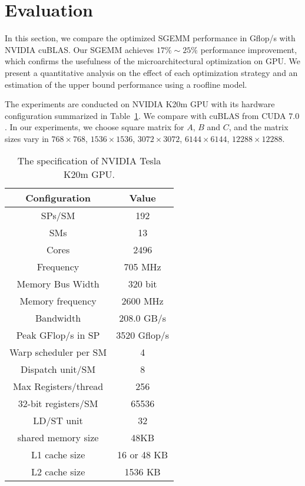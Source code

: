 \section{Evaluation}
\label{sec:experiment}


In this section, we compare the optimized SGEMM performance in Gflop/s with NVIDIA cuBLAS. 
Our SGEMM achieves $17\%\sim 25\%$ performance
improvement, which confirms the usefulness of the microarchitectural optimization on GPU. 
We present 
a quantitative analysis on the effect of each optimization strategy and an estimation of the upper bound performance using a roofline model.

The experiments are conducted on NVIDIA K20m GPU with its hardware configuration summarized in 
Table~\ref{table:k20}. We compare with cuBLAS from CUDA $7.0$. In our experiments, we choose square matrix for $A$, $B$
and $C$, and  the matrix sizes vary in $768\times768$, $1536\times1536$, $3072\times3072$, $6144\times6144$, $12288\times12288$.

\begin{table}[htbp]
\caption{The specification of NVIDIA Tesla K20m GPU.}
\centering
\scalebox{0.8} {
\begin{tabular}{|c|c|}
\hline
Configuration& Value\\
\hline
SPs/SM &192\\
\hline
SMs&13\\
\hline
Cores &2496\\
\hline
Frequency&705 MHz\\
\hline
Memory Bus Width&320 bit \\
\hline
Memory frequency&2600 MHz\\
\hline
Bandwidth&208.0 GB/s\\
\hline
Peak GFlop/s in SP&3520 Gflop/s\\
\hline
Warp scheduler per SM&4\\
\hline
Dispatch unit/SM&8\\
\hline
Max Registers/thread&256 \\
\hline
    32-bit registers/SM&65536 \\ %
\hline
LD/ST unit&32 \\
\hline
shared memory size&48KB\\
\hline
L1 cache size&16 or 48 KB\\
\hline
L2 cache size&1536 KB\\
\hline
\end{tabular}
}
\label{table:k20}
\end{table}


